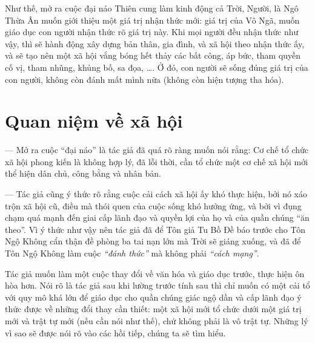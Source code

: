Như thế, mở ra cuộc đại náo Thiên cung làm kinh động cả Trời, Người, là Ngô Thừa Ân muốn giới thiệu một giá trị nhận thức mới: giá trị của Vô Ngã, muốn giáo dục con người nhận thức rõ giá trị này. Khi mọi người đều nhận thức như vậy, thì sẽ hành động xây dựng bản thân, gia đình, và xã hội theo nhận thức ấy, và sẽ tạo nên một xã hội vắng bóng hết thảy các bất công, áp bức, tham quyền cố vị, tham nhũng, khủng bố, sa đọa, \ldots. Ở đó, con người sẽ sống đúng giá trị của con người, không còn đánh mất mình nữa (không còn hiện tượng tha hóa).


\section{Quan niệm về xã hội} %
\label{sec:4_xa_hoi}

--- Mở ra cuộc ``đại náo'' là tác giả đã quá rõ ràng muốn nói rằng: Cơ chế tổ chức xã hội phong kiến là không hợp lý, đã lỗi thời, cần tổ chức một cơ chế xã hội mới thể hiện dân chủ, công bằng và nhân bản.

--- Tác giả cũng ý thức rõ rằng cuộc cải cách xã hội ấy khó thực hiện, bởi nó xáo trộn xã hội cũ, điều mà thói quen của cuộc sống khó hưởng ứng, và bởi vì đụng chạm quá mạnh đến giai cấp lãnh đạo và quyền lợi của họ và của quần chúng ``ăn theo''. Vì ý thức như vậy nên tác giả đã để Tôn giả Tu Bồ Đề báo trước cho Tôn Ngộ Không cẩn thận đề phòng ba tai nạn lớn mà Trời sẽ giáng xuống, và đã để Tôn Ngộ Không làm cuộc \emph{``đánh thức''} mà không phải \emph{``cách mạng''}.

Tác giả muốn làm một cuộc thay đổi về văn hóa và giáo dục trước, thực hiện ôn hòa hơn. Nói rõ là tác giả sau khi lường trước tính sau thì chỉ muốn có một cải tổ với quy mô khá lớn để giáo dục cho quần chúng giác ngộ dần và cấp lãnh đạo ý thức được về những đổi thay cần thiết: một xã hội mới tổ chức dưới một giá trị mới và trật tự mới (nếu cần nói như thế), chứ không phải là vô trật tự. Những lý vì sao sẽ được nói rõ vào các hồi tiếp, chúng ta sẽ tìm hiểu.

